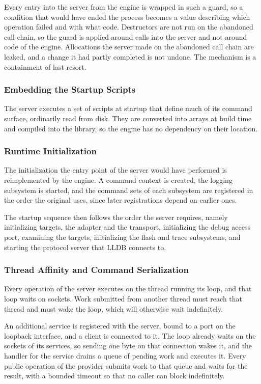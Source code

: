 Every entry into the server from the engine is wrapped in such a guard, so a condition that would have ended the process becomes a value describing which operation failed and with what code. Destructors are not run on the abandoned call chain, so the guard is applied around calls into the server and not around code of the engine. Allocations the server made on the abandoned call chain are leaked, and a change it had partly completed is not undone. The mechanism is a containment of last resort.


\subsubsection{Embedding the Startup Scripts}
The server executes a set of scripts at startup that define much of its command surface, ordinarily read from disk. They are converted into arrays at build time and compiled into the library, so the engine has no dependency on their location.

\subsubsection{Runtime Initialization}
The initialization the entry point of the server would have performed is reimplemented by the engine. A command context is created, the logging subsystem is started, and the command sets of each subsystem are registered in the order the original uses, since later registrations depend on earlier ones.

The startup sequence then follows the order the server requires, namely initializing targets, the adapter and the transport, initializing the debug access port, examining the targets, initializing the flash and trace subsystems, and starting the protocol server that LLDB connects to.

\subsubsection{Thread Affinity and Command Serialization}
Every operation of the server executes on the thread running its loop, and that loop waits on sockets. Work submitted from another thread must reach that thread and must wake the loop, which will otherwise wait indefinitely.

An additional service is registered with the server, bound to a port on the loopback interface, and a client is connected to it. The loop already waits on the sockets of its services, so sending one byte on that connection wakes it, and the handler for the service drains a queue of pending work and executes it. Every public operation of the provider submits work to that queue and waits for the result, with a bounded timeout so that no caller can block indefinitely.

